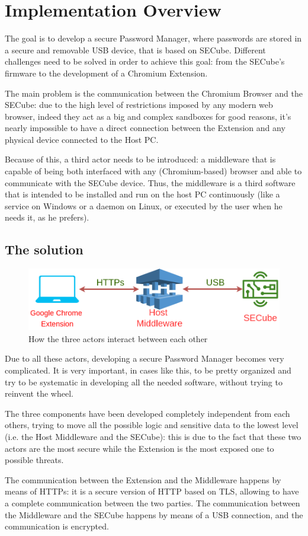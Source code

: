 \chapter{Implementation Overview}
\label{sec:implementation-overview}

The goal is to develop a secure Password Manager, where passwords are stored in a secure and removable USB device, that is based on SECube. Different challenges need to be solved in order to achieve this goal: from the SECube's firmware to the development of a Chromium Extension. \bigskip

The main problem is the communication between the Chromium Browser and the SECube: due to the high level of restrictions imposed by any modern web browser, indeed they act as a big and complex sandboxes for good reasons, it's nearly impossible to have a direct connection between the Extension and any physical device connected to the Host PC. \bigskip

Because of this, a third actor needs to be introduced: a middleware that is capable of being both interfaced with any (Chromium-based) browser and able to communicate with the SECube device. Thus, the middleware is a third software that is intended to be installed and run on the host PC continuously (like a service on Windows or a daemon on Linux, or executed by the user when he needs it, as he prefers). \bigskip

\section{The solution}

\begin{figure}[H]
	\centering
	\includegraphics[width=0.9\linewidth]{images/overview}
	\caption{How the three actors interact between each other}
	\label{fig:overview}
\end{figure}

Due to all these actors, developing a secure Password Manager becomes very complicated. It is very important, in cases like this, to be pretty organized and try to be systematic in developing all the needed software, without trying to reinvent the wheel. \bigskip

The three components have been developed completely independent from each others, trying to move all the possible logic and sensitive data to the lowest level (i.e. the Host Middleware and the SECube): this is due to the fact that these two actors are the most secure while the Extension is the most exposed one to possible threats. \bigskip

The communication between the Extension and the Middleware happens by means of HTTPs: it is a secure version of HTTP based on TLS, allowing to have a complete communication between the two parties. The communication between the Middleware and the SECube happens by means of a USB connection, and the communication is encrypted. 